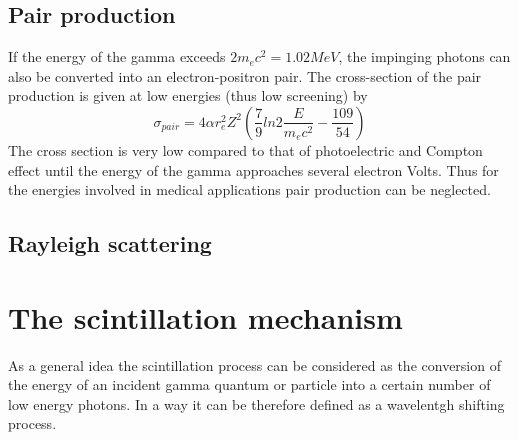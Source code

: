 
\subsection{Pair production}


If the energy of the gamma exceeds $2m_{e}c^{2} = 1.02 MeV$, the impinging photons can also be converted into an electron-positron pair. The cross-section of the pair production is given at low energies (thus low screening) by
\begin{equation}
\sigma _{pair} = 4\alpha r_{e}^{2} Z^{2} \left( \frac{7}{9}ln2\frac{E}{m_{e}c^{2}} - \frac{109}{54}\right)
\end{equation}
The cross section is very low compared to that of photoelectric and Compton effect until the energy of the gamma approaches several electron Volts. Thus for the energies involved in medical applications pair production can be neglected.

\subsection{Rayleigh scattering}



\section{The scintillation mechanism}
As a general idea the scintillation process can be considered as the conversion of the energy of an incident gamma quantum or particle into a certain number of low energy photons\cite{Rodnyi1997}. In a way it can be therefore defined as a wavelentgh shifting process\cite{Lecoq2006}.

